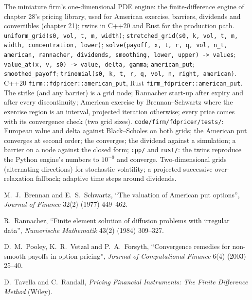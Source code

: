 \begin{build}
 The miniature firm's one-dimensional PDE engine: the finite-difference engine of chapter 28's pricing library, used for American
exercise, barriers, dividends and convertibles (chapter 21); twins in C++20 and Rust for the production path.
 \texttt{uniform\_grid(s0, vol, t, m, width)}; \texttt{stretched\_grid(s0, k, vol, t, m, width, concentration, lower)};
\texttt{solve(payoff, x, t, r, q, vol, n\_t, american, rannacher, dividends, smoothing, lower, upper) -> values}; \texttt{value\_at(x, v, s0) -> value,
delta, gamma}; \texttt{american\_put}; \texttt{smoothed\_payoff}; \texttt{trinomial(s0, k, t, r, q, vol, n, right, american)}. C++20
\texttt{firm::fdpricer::american\_put}, Rust \texttt{firm\_fdpricer::american\_put}.
 The strike (and any barrier) is a grid node; Rannacher start-up after expiry and after every discontinuity; American exercise by
Brennan--Schwartz where the exercise region is an interval, projected iteration otherwise; every price comes with its convergence check (two grid
sizes).
 \texttt{code/firm/fdpricer/tests/}: European value and delta against Black--Scholes on both grids; the American put converges at
second order; the  converges; the dividend  against a simulation; a barrier on a node against the closed form;
\texttt{cpp/} and \texttt{rust/}: the twins reproduce the Python engine's numbers to $10^{-9}$ and converge.
 Two-dimensional grids (alternating directions) for stochastic volatility; a projected successive over-relaxation fallback; adaptive time
steps around dividends.
\end{build}

\begin{omsources}
\item M.~J.~Brennan and E.~S.~Schwartz, ``The valuation of American put options'', \emph{Journal of Finance} 32(2) (1977) 449--462.
\item R.~Rannacher, ``Finite element solution of diffusion problems with irregular data'', \emph{Numerische Mathematik} 43(2) (1984) 309--327.
\item D.~M.~Pooley, K.~R.~Vetzal and P.~A.~Forsyth, ``Convergence remedies for non-smooth payoffs in option pricing'', \emph{Journal of
Computational Finance} 6(4) (2003) 25--40.
\item D.~Tavella and C.~Randall, \emph{Pricing Financial Instruments: The Finite Difference Method} (Wiley).
\end{omsources}

